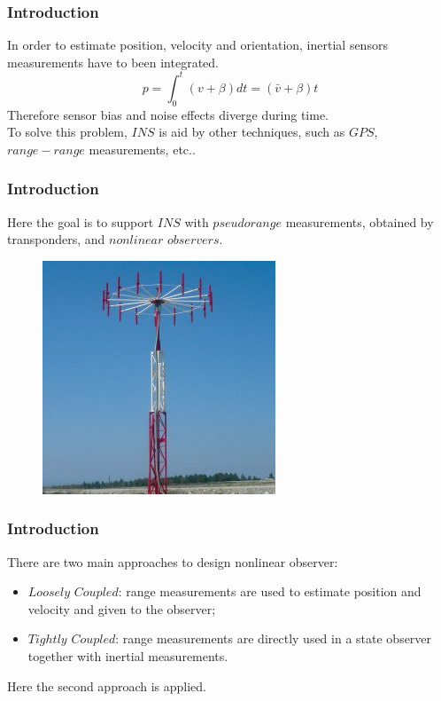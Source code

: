 \documentclass{beamer}
\begin{document}
	\begin{frame}
		\frametitle{Introduction}
		In order to estimate position, velocity and orientation, inertial sensors measurements have to been integrated.
		\[ p =  \int_0^t{(v+\beta) dt} = (\bar{v}+\beta) t \]
		\noindent
		Therefore sensor bias and noise effects diverge during time.\\
		To solve this problem, $INS$ is aid by other techniques, such as $GPS$, $range-range$ measurements, etc..
	\end{frame}

	\begin{frame}
		\frametitle{Introduction}
		Here the goal is to support $INS$ with $pseudorange$ measurements, obtained by transponders, and $nonlinear$ $observers$. 
		
		\begin{figure}[H]
			\includegraphics[scale=0.4]{transp}
		\end{figure}
	\end{frame}
	
	
	\begin{frame}
		\frametitle{Introduction}
    There are two main approaches to design nonlinear observer:
    
        \begin{itemize}
            
            \item $Loosely$ $Coupled$: range measurements are used to estimate position and velocity and given to the observer;
            \vspace{0.2cm}
            \item $Tightly$ $Coupled$: range measurements are directly used in a state observer together with inertial measurements.
        \end{itemize}
        \vspace{0.2cm}
        Here the second approach is applied.
    \end{frame}
	
\end{document}

